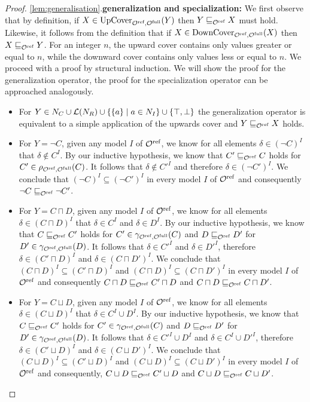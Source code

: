 \begin{proof}
  \item \ref{lem:generalisation}.\enspace \textbf{generalization and specialization:\enspace}
  We first observe that by definition, if $X \in {\ensuremath{\operatorname{UpCover}}}_{{\mathcal{O}^\textnormal{ref}},{\mathcal{O}^\textnormal{full}}}(Y)$ then $Y \sqsubseteq_{\mathcal{O}^\textnormal{ref}} X$ must hold. Likewise, it follows from the definition that if $X \in {\ensuremath{\operatorname{DownCover}}}_{{\mathcal{O}^\textnormal{ref}},{\mathcal{O}^\textnormal{full}}}(X)$ then $X \sqsubseteq_{\mathcal{O}^\textnormal{ref}} Y$. For an integer $n$, the upward cover contains only values greater or equal to $n$, while the downward cover contains only values less or equal to $n$. We proceed with a proof by structural induction. We will show the proof for the generalization operator, the proof for the specialization operator can be approached analogously.
  \begin{itemize}
    \item For $Y \in N_C \cup \mathcal{L}(N_R) \cup \{ \{a\} \mid a \in N_I \} \cup \{ \top, \bot \}$ the generalization operator is equivalent to a simple application of the upwards cover and $Y \sqsubseteq_{\mathcal{O}^\textnormal{ref}} X$ holds.
    \item For $Y = \lnot C$, given any model $I$ of ${\mathcal{O}^\textnormal{ref}}$, we know for all elements $\delta \in (\lnot C)^I$ that $\delta \not\in C^I$. By our inductive hypothesis, we know that $C' \sqsubseteq_{\mathcal{O}^\textnormal{ref}} C$ holds for $C' \in \rho_{{\mathcal{O}^\textnormal{ref}},{\mathcal{O}^\textnormal{full}}}(C)$. It follows that $\delta \not\in C'^I$ and therefore $\delta \in (\lnot C')^I$. We conclude that $(\lnot C)^I \subseteq (\lnot C')^I$ in every model $I$ of ${\mathcal{O}^\textnormal{ref}}$ and consequently $\lnot C \sqsubseteq_{\mathcal{O}^\textnormal{ref}} \lnot C'$.
    \item For $Y = C \sqcap D$, given any model $I$ of ${\mathcal{O}^\textnormal{ref}}$, we know for all elements $\delta \in (C \sqcap D)^I$ that $\delta \in C^I$ and $\delta \in D^I$. By our inductive hypothesis, we know that $C \sqsubseteq_{\mathcal{O}^\textnormal{ref}} C'$ holds for $C' \in \gamma_{{\mathcal{O}^\textnormal{ref}},{\mathcal{O}^\textnormal{full}}}(C)$ and $D \sqsubseteq_{\mathcal{O}^\textnormal{ref}} D'$ for $D' \in \gamma_{{\mathcal{O}^\textnormal{ref}},{\mathcal{O}^\textnormal{full}}}(D)$. It follows that $\delta \in C'^I$ and $\delta \in D'^I$, therefore $\delta \in (C' \sqcap D)^I$ and $\delta \in (C \sqcap D')^I$. We conclude that $(C \sqcap D)^I \subseteq (C' \sqcap D)^I$ and $(C \sqcap D)^I \subseteq (C \sqcap D')^I$ in every model $I$ of ${\mathcal{O}^\textnormal{ref}}$ and consequently $C \sqcap D \sqsubseteq_{\mathcal{O}^\textnormal{ref}} C' \sqcap D$ and $C \sqcap D \sqsubseteq_{\mathcal{O}^\textnormal{ref}} C \sqcap D'$.
    \item For $Y = C \sqcup D$, given any model $I$ of ${\mathcal{O}^\textnormal{ref}}$, we know for all elements $\delta \in (C \sqcup D)^I$ that $\delta \in C^I \cup D^I$. By our inductive hypothesis, we know that $C \sqsubseteq_{\mathcal{O}^\textnormal{ref}} C'$ holds for $C' \in \gamma_{{\mathcal{O}^\textnormal{ref}},{\mathcal{O}^\textnormal{full}}}(C)$ and $D \sqsubseteq_{\mathcal{O}^\textnormal{ref}} D'$ for $D' \in \gamma_{{\mathcal{O}^\textnormal{ref}},{\mathcal{O}^\textnormal{full}}}(D)$. It follows that $\delta \in C'^I \cup D^I$ and $\delta \in C^I \cup D'^I$, therefore $\delta \in (C' \sqcup D)^I$ and $\delta \in (C \sqcup D')^I$. We conclude that $(C \sqcup D)^I \subseteq (C' \sqcup D)^I$ and $(C \sqcup D)^I \subseteq (C \sqcup D')^I$ in every model $I$ of ${\mathcal{O}^\textnormal{ref}}$ and consequently, $C \sqcup D \sqsubseteq_{\mathcal{O}^\textnormal{ref}} C' \sqcup D$ and $C \sqcup D \sqsubseteq_{\mathcal{O}^\textnormal{ref}} C \sqcup D'$.

\end{itemize}
\end{proof}
